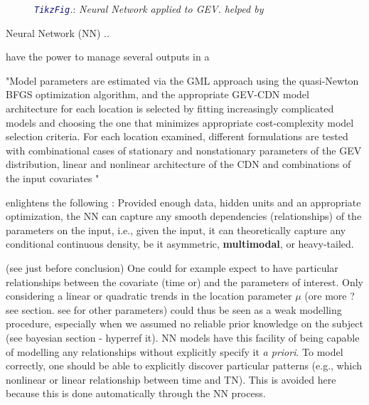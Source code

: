 \documentclass[11pt,a4paper,openany ]{book}
\begin{document}
\begin{figure}
\begin{center}
{{
		}
	}
	\vspace{-2.5mm}
	\caption{\textcolor{MidnightBlue}{\emph{\texttt{TikzFig}.}}:\emph{ Neural Network applied to GEV. helped by \textcolor{JungleGreen}{\cite{cannon_flexible_2010}}} }
	\end{center}
\end{figure}

Neural Network (NN) ..

have the power to manage several outputs in a 

"Model parameters are estimated via the GML approach using the
quasi-Newton BFGS optimization algorithm, and the appropriate GEV-CDN model architecture for
each location is selected by fitting increasingly complicated models and choosing the one that
minimizes appropriate cost-complexity model selection criteria. For each location examined, different
formulations are tested with combinational cases of stationary and nonstationary parameters of the
GEV distribution, linear and nonlinear architecture of the CDN and combinations of the input covariates "


\cite{carreau_hybrid_2009} enlightens the following : Provided enough data, hidden units and an appropriate optimization, the NN can capture any smooth dependencies (relationships) of the parameters on the input, i.e., given the input, it can theoretically capture any conditional continuous density, be it asymmetric, \textbf{multimodal}, or heavy-tailed.

(see \citet{cannon_flexible_2010} just before conclusion) 
One could for example expect to have particular relationships between the covariate (time or) and the parameters of interest. Only considering a linear or quadratic trends in the location parameter $\mu$ (ore more ? see section. see for other parameters) could thus be seen as a weak modelling procedure, especially when we assumed no reliable prior knowledge on the subject (see bayesian section - hyperref it).
NN models have this facility of being capable of modelling any relationships without explicitly specify it \emph{a priori}. To model correctly, one should be able to explicitly discover particular patterns (e.g., which nonlinear or linear relationship between time and TN). This is avoided here because this is done automatically through the NN process.
\end{document}
